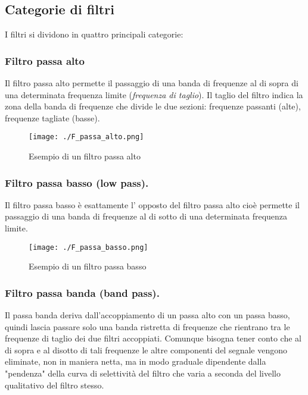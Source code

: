 \subsection{Categorie di filtri}

I filtri si dividono in quattro principali categorie:

\subsubsection{Filtro passa alto}

Il filtro passa alto permette il passaggio di una banda di frequenze al di sopra di una determinata frequenza limite (\textit{frequenza di taglio}). Il taglio del filtro indica la zona della banda di frequenze che divide le due sezioni: frequenze passanti (alte), frequenze tagliate (basse).
\begin{figure}[h]
 \centering
 \texttt{[image: ./F\_passa\_alto.png]}
  \caption{Esempio di un filtro passa alto \cite{SELET}}
 \end{figure}

\subsubsection{Filtro passa basso (low pass).}
Il filtro passa basso \`e esattamente l' opposto del filtro passa alto cio\`e permette il passaggio di una banda di frequenze al di sotto di una determinata frequenza limite. 

\begin{figure}[h]
 \centering
 \texttt{[image: ./F\_passa\_basso.png]}
  \caption{Esempio di un filtro passa basso \cite{SELET}}
\end{figure}



\subsubsection{Filtro passa banda (band pass).}
Il passa banda deriva dall'accoppiamento di un passa alto con un passa basso, quindi lascia passare solo una banda ristretta di frequenze che rientrano tra le frequenze di taglio dei due filtri accoppiati.
Comunque bisogna tener conto che al di sopra e al disotto di tali frequenze le altre componenti del segnale vengono eliminate, non in maniera netta, ma in modo graduale dipendente dalla "pendenza" della curva di selettivit\`a del filtro che varia a seconda del livello qualitativo del filtro stesso.

